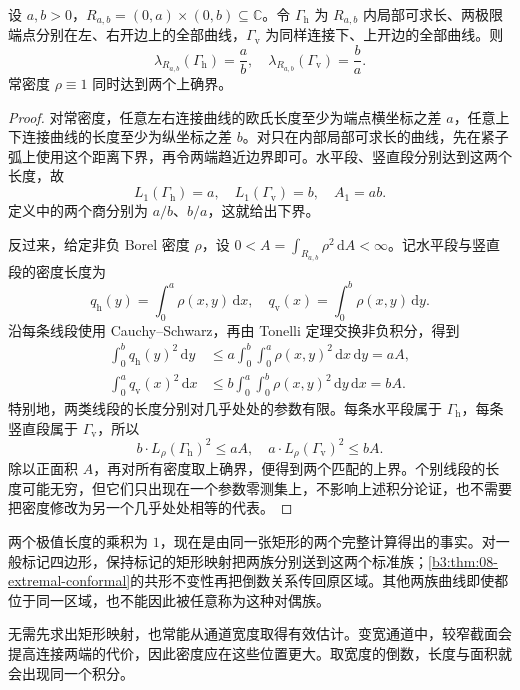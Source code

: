 \begin{theorem}[矩形的两个连接族]\label{b3:thm:08-rectangle-extremal}
设 \(a,b>0\)，\(R_{a,b}=(0,a)\times(0,b)\subseteq\mathbb C\)。令 \(\Gamma_{\mathrm h}\) 为 \(R_{a,b}\) 内局部可求长、两极限端点分别在左、右开边上的全部曲线，\(\Gamma_{\mathrm v}\) 为同样连接下、上开边的全部曲线。则
\[
 \lambda_{R_{a,b}}(\Gamma_{\mathrm h})=\frac ab,\quad
 \lambda_{R_{a,b}}(\Gamma_{\mathrm v})=\frac ba.
\]
常密度 \(\rho\equiv1\) 同时达到两个上确界。
\end{theorem}
\begin{proof}
对常密度，任意左右连接曲线的欧氏长度至少为端点横坐标之差 \(a\)，任意上下连接曲线的长度至少为纵坐标之差 \(b\)。对只在内部局部可求长的曲线，先在紧子弧上使用这个距离下界，再令两端趋近边界即可。水平段、竖直段分别达到这两个长度，故
\[
 L_1(\Gamma_{\mathrm h})=a,\quad
 L_1(\Gamma_{\mathrm v})=b,\quad A_1=ab.
\]
定义中的两个商分别为 \(a/b\)、\(b/a\)，这就给出下界。

反过来，给定非负 Borel 密度 \(\rho\)，设 \(0<A=\int_{R_{a,b}}\rho^2\,\mathrm dA<\infty\)。记水平段与竖直段的密度长度为
\[
 q_{\mathrm h}(y)=\int_0^a\rho(x,y)\,\mathrm dx,\quad
 q_{\mathrm v}(x)=\int_0^b\rho(x,y)\,\mathrm dy.
\]
沿每条线段使用 Cauchy--Schwarz，再由 Tonelli 定理交换非负积分，得到
\[
 \begin{aligned}
 \int_0^b q_{\mathrm h}(y)^2\,\mathrm dy
 &\le a\int_0^b\int_0^a\rho(x,y)^2\,\mathrm dx\,\mathrm dy=aA,\\
 \int_0^a q_{\mathrm v}(x)^2\,\mathrm dx
 &\le b\int_0^a\int_0^b\rho(x,y)^2\,\mathrm dy\,\mathrm dx=bA.
 \end{aligned}
\]
特别地，两类线段的长度分别对几乎处处的参数有限。每条水平段属于 \(\Gamma_{\mathrm h}\)，每条竖直段属于 \(\Gamma_{\mathrm v}\)，所以
\[
 b\cdot L_\rho(\Gamma_{\mathrm h})^2\le aA,\quad
 a\cdot L_\rho(\Gamma_{\mathrm v})^2\le bA.
\]
除以正面积 \(A\)，再对所有密度取上确界，便得到两个匹配的上界。个别线段的长度可能无穷，但它们只出现在一个参数零测集上，不影响上述积分论证，也不需要把密度修改为另一个几乎处处相等的代表。
\end{proof}

两个极值长度的乘积为 \(1\)，现在是由同一张矩形的两个完整计算得出的事实。对一般标记四边形，保持标记的矩形映射把两族分别送到这两个标准族；\cref{b3:thm:08-extremal-conformal}的共形不变性再把倒数关系传回原区域。其他两族曲线即使都位于同一区域，也不能因此被任意称为这种对偶族。

\ProseParagraphBreak
无需先求出矩形映射，也常能从通道宽度取得有效估计。变宽通道中，较窄截面会提高连接两端的代价，因此密度应在这些位置更大。取宽度的倒数，长度与面积就会出现同一个积分。

